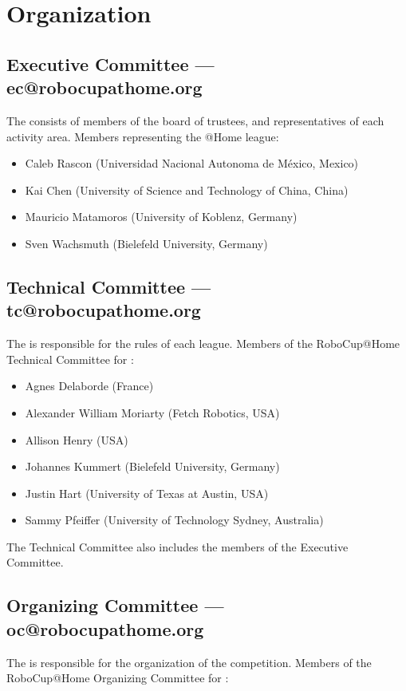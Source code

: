 \section{Organization}

\subsection{Executive Committee --- ec@robocupathome.org}
\label{sec:ec}
The  consists of members of the board of trustees, and representatives of each activity area. Members representing the @Home league:
\begin{itemize}
	\item Caleb Rascon (Universidad Nacional Autonoma de México, Mexico)
	\item Kai Chen (University of Science and Technology of China, China)
	\item Mauricio Matamoros (University of Koblenz, Germany)
	\item Sven Wachsmuth (Bielefeld University, Germany)
\end{itemize}

\subsection{Technical Committee --- tc@robocupathome.org}
\label{sec:tc}
The  is responsible for the rules of each league. Members of the RoboCup@Home Technical Committee for \YEAR:
\begin{itemize}
	\item Agnes Delaborde (France)
	\item Alexander William Moriarty (Fetch Robotics, USA)
	\item Allison Henry (USA)
	\item Johannes Kummert (Bielefeld University, Germany)
	\item Justin Hart (University of Texas at Austin, USA)
	\item Sammy Pfeiffer (University of Technology Sydney, Australia)
\end{itemize}
The Technical Committee also includes the members of the Executive Committee.

\subsection{Organizing Committee --- oc@robocupathome.org}
\label{sec:oc}
The  is responsible for the organization of the competition. Members of the RoboCup@Home Organizing Committee for \YEAR:

